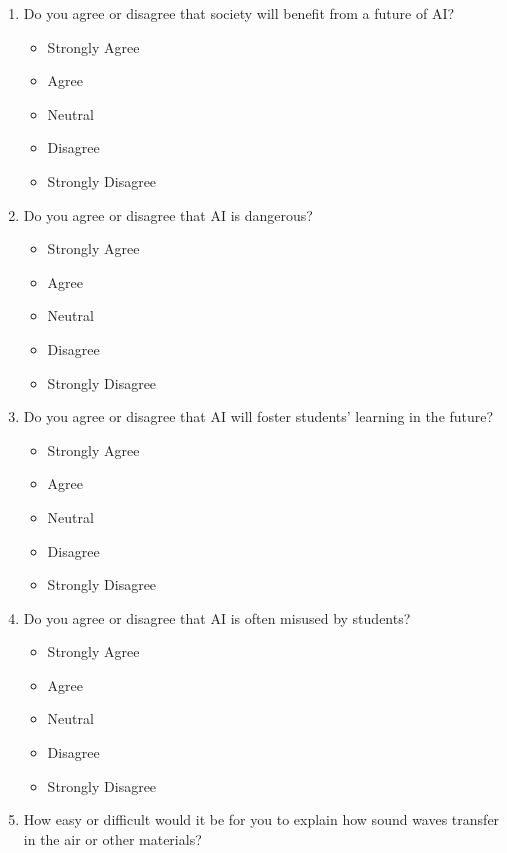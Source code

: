 \documentclass[
  11pt,
]{article}
\providecommand{\tightlist}{%
  \setlength{\itemsep}{0pt}\setlength{\parskip}{0pt}}
\begin{document}
\begin{enumerate}
\def\labelenumi{\arabic{enumi}.}
\item
  Do you agree or disagree that society will benefit from a future of AI?

  \begin{itemize}
  \tightlist
  \item
    Strongly Agree
  \item
    Agree
  \item
    Neutral
  \item
    Disagree
  \item
    Strongly Disagree
  \end{itemize}
\item
  Do you agree or disagree that AI is dangerous?

  \begin{itemize}
  \tightlist
  \item
    Strongly Agree
  \item
    Agree
  \item
    Neutral
  \item
    Disagree
  \item
    Strongly Disagree
  \end{itemize}
\item
  Do you agree or disagree that AI will foster students' learning in the future?

  \begin{itemize}
  \tightlist
  \item
    Strongly Agree
  \item
    Agree
  \item
    Neutral
  \item
    Disagree
  \item
    Strongly Disagree
  \end{itemize}
\item
  Do you agree or disagree that AI is often misused by students?

  \begin{itemize}
  \tightlist
  \item
    Strongly Agree
  \item
    Agree
  \item
    Neutral
  \item
    Disagree
  \item
    Strongly Disagree
  \end{itemize}
\item
  How easy or difficult would it be for you to explain how sound waves transfer in the air or other materials?


\end{enumerate}
\end{document}
